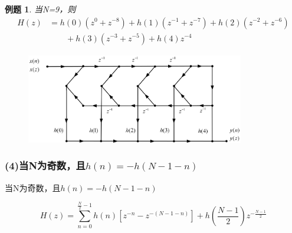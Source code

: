 \documentclass[notheorems,compress,mathserif,table]{beamer}
\newtheorem{example}{例题}
\begin{document}
\begin{frame}\frametitle{}%

\begin{example}
当N=9，则
\begin{equation*} \label{eq:1}
\begin{split}
H(z) &= h(0)(z^0+z^{-8})+h(1)(z^{-1}+z^{-7})+h(2)(z^{-2}+z^{-6})\\
     &\quad\quad +h(3)(z^{-3}+z^{-5})+h(4)z^{-4}
\end{split}
\end{equation*}
\end{example}
\begin{figure}[ht]
\centering
\includegraphics[width=0.85\textwidth]{jsxxxw.jpg}
\end{figure}

\end{frame}
\begin{frame}\frametitle{(4)当N为奇数，且$h(n)= -h(N-1-n)$}%
当N为奇数，且$h(n)= -h(N-1-n)$

    $$H(z)=\sum_{n=0}^{\frac{N}{2}-1}h(n)\left[ z^{-n}-z^{-(N-1-n)}\right]+
    h(\frac{N-1}{2})z^{-\frac{N-1}{2}}$$
\end{frame}
\end{document}
